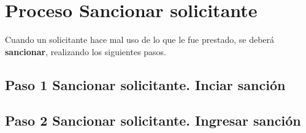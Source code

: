 \chapter{Proceso Sancionar solicitante}
	Cuando un solicitante hace mal uso de lo que le fue prestado, 
	se deberá \textbf{sancionar}, realizando los siguientes pasos.


\section{Paso 1 Sancionar solicitante. Inciar sanción}
	

\section{Paso 2 Sancionar solicitante. Ingresar sanción}
	
